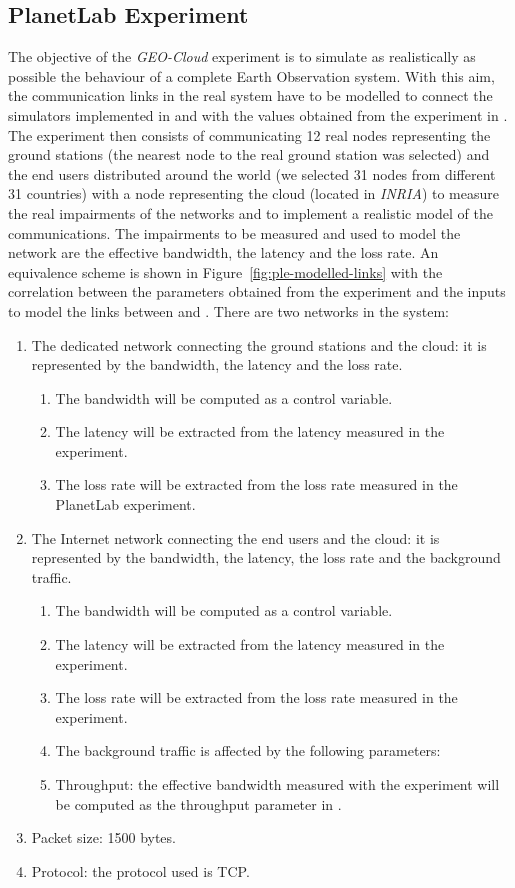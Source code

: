 \subsection{PlanetLab Experiment}

The objective of the \emph{GEO-Cloud} experiment is to simulate as realistically as possible the behaviour of a complete Earth Observation system. With this aim, the communication links in the real system have to be modelled to connect the simulators implemented in \vw and \bonfire with the values obtained from the experiment in \pl. The experiment then consists of communicating 12 real nodes representing the ground stations (the nearest \pl node to the real ground station was selected) and the end users distributed around the world (we selected 31 nodes from different 31 countries) with a node representing the cloud (located in \emph{INRIA}) to measure the real impairments of the networks and to implement a realistic model of the communications. The impairments to be measured and used to model the network are the effective bandwidth, the latency and the loss rate.
An equivalence scheme is shown in Figure~\ref{fig:ple-modelled-links} with the correlation between the
parameters obtained from the experiment and the inputs to model the links
between \vw and \bonfire.  There are two networks in the system:
\begin{enumerate}
\item The dedicated network connecting the ground stations and the cloud: it
  is represented by the bandwidth, the latency and the loss rate.
\begin{enumerate}
\item The bandwidth will be computed as a control variable.
\item The latency will be extracted from the latency measured in the \pl experiment.
\item The loss rate will be extracted from the loss rate measured in the PlanetLab experiment.
 \end{enumerate}
\item	The Internet network connecting the end users and the cloud: it is
  represented by the bandwidth, the latency, the loss rate and the background
  traffic.
\begin{enumerate}
\item The bandwidth will be computed as a control variable.
\item The latency will be extracted from the latency measured in the \pl experiment.
\item The loss rate will be extracted from the loss rate measured in the \pl experiment.
\item The background traffic is affected by the following parameters:
\item Throughput: the effective bandwidth measured with the \pl
experiment will be computed as the throughput parameter in \vw.
\end{enumerate}

\item Packet size: 1500 bytes.
\item Protocol: the protocol used is TCP.
\end{enumerate}

